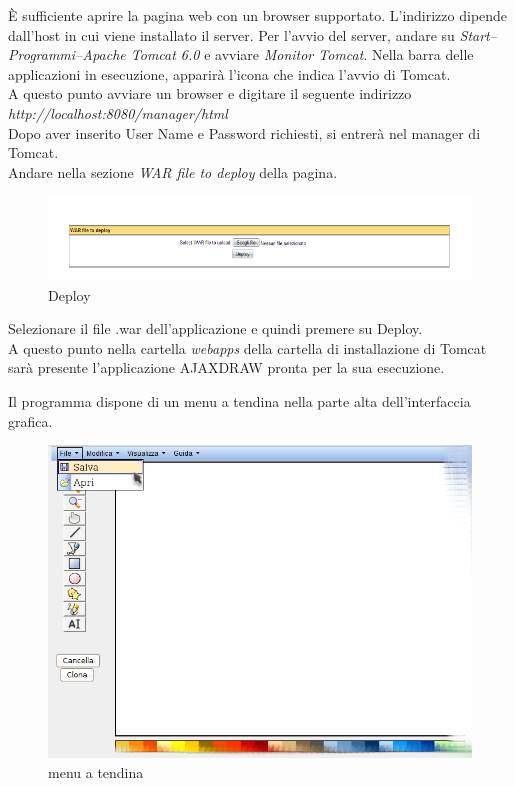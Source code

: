 \`E sufficiente aprire la pagina web con un browser supportato. L'indirizzo dipende dall'host in cui viene installato il server.
Per l'avvio del server, andare su \textit{Start--Programmi--Apache Tomcat 6.0} e avviare \textit{Monitor Tomcat}.
Nella barra delle applicazioni in esecuzione, apparir\`a l'icona che indica l'avvio di Tomcat.\\
A questo punto avviare un browser e digitare il seguente indirizzo\\ \textit{http://localhost:8080/manager/html}\\
Dopo aver inserito User Name e Password richiesti, si entrer\`a nel manager di Tomcat.\\
Andare nella sezione \textit{WAR file to deploy} della pagina.

\newpage
\begin{figure}[!ht]
\centering
\includegraphics[scale=0.7]{images/DeployTomcat.png}
\caption{Deploy}
\end{figure} 

Selezionare il file .war dell'applicazione e quindi premere su Deploy.\\
A questo punto nella cartella \textit{webapps} della cartella di installazione di Tomcat sar\`a presente l'applicazione AJAXDRAW pronta per la sua esecuzione. 


Il programma dispone di un menu a tendina nella parte alta dell'interfaccia grafica.

\begin{figure}[!ht]
\centering
\includegraphics[scale=0.4]{images/menu.png}
\caption{menu a tendina}
\end{figure} 


